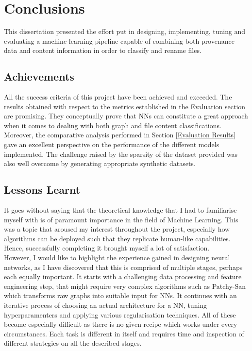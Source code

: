 
    
    \chapter{Conclusions}
    This dissertation presented the effort put in designing, implementing, tuning and evaluating a machine learning pipeline capable of combining both provenance data and content information in order to classify and rename files.
    
    \section{Achievements}
    All the success criteria of this project have been achieved and exceeded. The results obtained with respect to the metrics established in the Evaluation section are promising. They conceptually prove that NNs can constitute a great approach when it comes to dealing with both graph and file content classifications.  Moreover, the comparative analysis performed in Section \ref{Evaluation Results} gave an excellent perspective on the performance of the different models implemented. The challenge raised by the sparsity of the dataset provided was also well overcome by generating appropriate synthetic datasets.
    
    
    \section{Lessons Learnt}
    It goes without saying that the theoretical knowledge that I had to familiarise myself with is of paramount importance in the field of Machine Learning. This was a topic that aroused my interest throughout the project, especially how algorithms can be deployed such that they replicate human-like capabilities. Hence, successfully completing it brought myself a lot of satisfaction. \\
    
    However, I would like to highlight the experience gained in designing neural networks, as I have discovered that this is comprised of multiple stages, perhaps each equally important. It starts with a challenging data processing and feature engineering step, that might require very complex algorithms such as Patchy-San which transforms raw graphs into suitable input for NNs. It continues with an iterative process of choosing an actual architecture for a NN, tuning hyperparamenters and applying various regularisation techniques. All of these become especially difficult as there is no given recipe which works under every circumstances. Each task is different in itself and requires time and inspection of different strategies on all the described stages. \\
    
